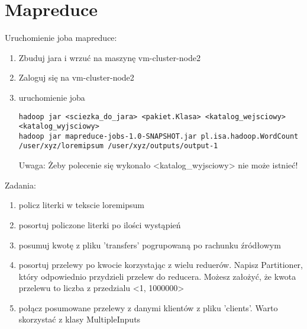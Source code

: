 \documentclass{article}
\begin{document}
\section*{Mapreduce}

Uruchomienie joba mapreduce:
\begin{enumerate}
\item Zbuduj jara i wrzuć na maszynę vm-cluster-node2
\item Zaloguj się na vm-cluster-node2
\item uruchomienie joba
	\begin{lstlisting}[]
hadoop jar <sciezka_do_jara> <pakiet.Klasa> <katalog_wejsciowy> <katalog_wyjsciowy>
hadoop jar mapreduce-jobs-1.0-SNAPSHOT.jar pl.isa.hadoop.WordCount /user/xyz/loremipsum /user/xyz/outputs/output-1
\end{lstlisting}

Uwaga: Żeby polecenie się wykonało <katalog\_wyjsciowy> nie może istnieć!
\end{enumerate}

Zadania:
\begin{enumerate}
\item policz literki w tekscie loremipsum
\item posortuj policzone literki po ilości wystąpień
\item posumuj kwotę z pliku 'transfers' pogrupowaną po rachunku źródłowym
\item posortuj przelewy po kwocie korzystając z wielu reduerów. Napisz Partitioner, który odpowiednio przydzieli przelew do reducera. Możesz założyć, że kwota przelewu to liczba z przedzialu <1, 1000000>
\item połącz posumowane przelewy z danymi klientów z pliku 'clients'. Warto skorzystać z klasy MultipleInputs
\end{enumerate}
\end{document}
